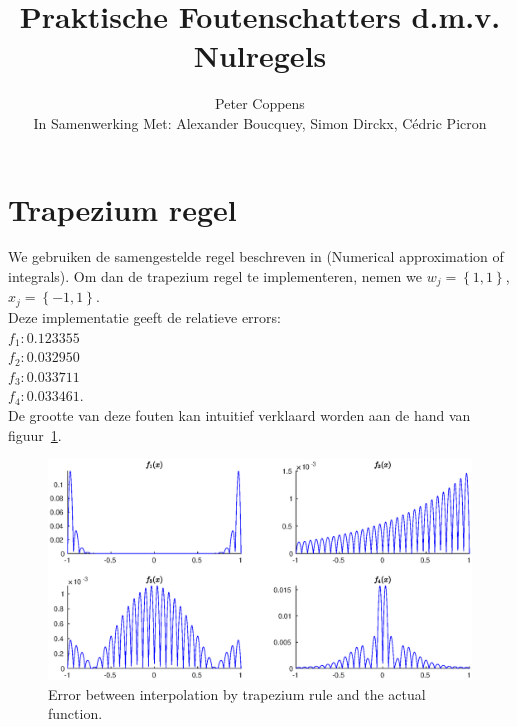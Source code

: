 \documentclass{article}
\title{Praktische Foutenschatters d.m.v. Nulregels}
\author{Peter Coppens \\ In Samenwerking Met: Alexander Boucquey, Simon Dirckx, Cédric Picron}
\date{}
\begin{document}

\maketitle

\section{Trapezium regel}
We gebruiken de samengestelde regel beschreven in (Numerical approximation of integrals). Om dan de trapezium regel te implementeren, nemen we $w_j = \left\{1, 1\right\}$, $x_j = \left\{-1, 1\right\}$. \\

Deze implementatie geeft de relatieve errors: \\
$f_1: 0.123355$ \\
$f_2: 0.032950$ \\
$f_3: 0.033711$ \\
$f_4: 0.033461$. \\

De grootte van deze fouten kan intuitief verklaard worden aan de hand van figuur~\ref{fig:ctrap}.

\begin{figure}[H]
\centering
\includegraphics[width=\linewidth, trim=2cm 0.5cm 2cm 0.5cm, clip]{ctrap.eps}
\caption{Error between interpolation by trapezium rule and the actual function.} \label{fig:ctrap}
\end{figure}
\end{document}
